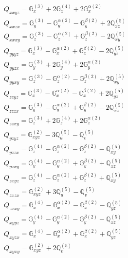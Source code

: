 \documentclass[fleqn,8pt,landscape]{jsarticle}
\begin{document}
\begin{align*}
& Q_{xxyz} = \mathbb{G}_{x}^{(3)} + 2 \mathbb{G}_{x}^{(4)} + 2 \mathbb{G}_{x}^{\alpha(2)} \\
& Q_{xxzx} = \mathbb{G}_{y}^{(3)} - \mathbb{G}_{y}^{\alpha(2)} - \mathbb{G}_{y}^{\beta(2)} + 2 \mathbb{Q}_{xz}^{(5)} \\
& Q_{xxxy} = \mathbb{G}_{z}^{(3)} - \mathbb{G}_{z}^{\alpha(2)} + \mathbb{G}_{z}^{\beta(2)} - 2 \mathbb{Q}_{xy}^{(5)} \\
& Q_{yyyz} = \mathbb{G}_{x}^{(3)} - \mathbb{G}_{x}^{\alpha(2)} + \mathbb{G}_{x}^{\beta(2)} - 2 \mathbb{Q}_{yz}^{(5)} \\
& Q_{yyzx} = \mathbb{G}_{y}^{(3)} + 2 \mathbb{G}_{y}^{(4)} + 2 \mathbb{G}_{y}^{\alpha(2)} \\
& Q_{yyxy} = \mathbb{G}_{z}^{(3)} - \mathbb{G}_{z}^{\alpha(2)} - \mathbb{G}_{z}^{\beta(2)} + 2 \mathbb{Q}_{xy}^{(5)} \\
& Q_{zzyz} = \mathbb{G}_{x}^{(3)} - \mathbb{G}_{x}^{\alpha(2)} - \mathbb{G}_{x}^{\beta(2)} + 2 \mathbb{Q}_{yz}^{(5)} \\
& Q_{zzzx} = \mathbb{G}_{y}^{(3)} - \mathbb{G}_{y}^{\alpha(2)} + \mathbb{G}_{y}^{\beta(2)} - 2 \mathbb{Q}_{xz}^{(5)} \\
& Q_{zzxy} = \mathbb{G}_{z}^{(3)} + 2 \mathbb{G}_{z}^{(4)} + 2 \mathbb{G}_{z}^{\alpha(2)} \\
& Q_{yzyz} = \mathbb{G}_{xyz}^{(2)} - 3 \mathbb{Q}_{u}^{(5)} - \mathbb{Q}_{v}^{(5)} \\
& Q_{yzzx} = \mathbb{G}_{z}^{(4)} - \mathbb{G}_{z}^{\alpha(2)} - \mathbb{G}_{z}^{\beta(2)} - \mathbb{Q}_{xy}^{(5)} \\
& Q_{yzxy} = \mathbb{G}_{y}^{(4)} - \mathbb{G}_{y}^{\alpha(2)} + \mathbb{G}_{y}^{\beta(2)} + \mathbb{Q}_{xz}^{(5)} \\
& Q_{zxyz} = \mathbb{G}_{z}^{(4)} - \mathbb{G}_{z}^{\alpha(2)} + \mathbb{G}_{z}^{\beta(2)} + \mathbb{Q}_{xy}^{(5)} \\
& Q_{zxzx} = \mathbb{G}_{xyz}^{(2)} + 3 \mathbb{Q}_{u}^{(5)} - \mathbb{Q}_{v}^{(5)} \\
& Q_{zxxy} = \mathbb{G}_{x}^{(4)} - \mathbb{G}_{x}^{\alpha(2)} - \mathbb{G}_{x}^{\beta(2)} - \mathbb{Q}_{yz}^{(5)} \\
& Q_{xyyz} = \mathbb{G}_{y}^{(4)} - \mathbb{G}_{y}^{\alpha(2)} - \mathbb{G}_{y}^{\beta(2)} - \mathbb{Q}_{xz}^{(5)} \\
& Q_{xyzx} = \mathbb{G}_{x}^{(4)} - \mathbb{G}_{x}^{\alpha(2)} + \mathbb{G}_{x}^{\beta(2)} + \mathbb{Q}_{yz}^{(5)} \\
& Q_{xyxy} = \mathbb{G}_{xyz}^{(2)} + 2 \mathbb{Q}_{v}^{(5)}
\end{align*}
\end{document}
